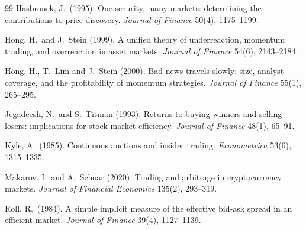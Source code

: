 \documentclass[11pt,a4paper]{article}
\begin{document}
\begin{thebibliography}{99}
Hasbrouck, J.\ (1995). One security, many markets: determining the
contributions to price discovery. \emph{Journal of Finance} 50(4),
1175--1199.

Hong, H.\ and J.\ Stein (1999). A unified theory of underreaction,
momentum trading, and overreaction in asset markets. \emph{Journal of
Finance} 54(6), 2143--2184.

Hong, H., T.\ Lim and J.\ Stein (2000). Bad news travels slowly: size,
analyst coverage, and the profitability of momentum strategies.
\emph{Journal of Finance} 55(1), 265--295.

Jegadeesh, N.\ and S.\ Titman (1993). Returns to buying winners and
selling losers: implications for stock market efficiency.
\emph{Journal of Finance} 48(1), 65--91.

Kyle, A.\ (1985). Continuous auctions and insider trading.
\emph{Econometrica} 53(6), 1315--1335.

Makarov, I.\ and A.\ Schoar (2020). Trading and arbitrage in
cryptocurrency markets. \emph{Journal of Financial Economics} 135(2),
293--319.

Roll, R.\ (1984). A simple implicit measure of the effective bid-ask
spread in an efficient market. \emph{Journal of Finance} 39(4),
1127--1139.

\end{thebibliography}
\end{document}
